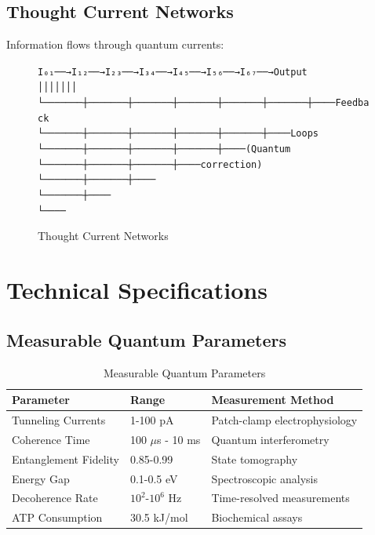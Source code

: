 \documentclass[11pt,a4paper]{article}
\newenvironment{asciiart}{\begin{alltt}}{\end{alltt}}
\begin{document}
\subsection{Thought Current Networks}

Information flows through quantum currents:

\begin{figure}[H]
\centering
\begin{asciiart}
I₀₁ ──→ I₁₂ ──→ I₂₃ ──→ I₃₄ ──→ I₄₅ ──→ I₅₆ ──→ I₆₇ ──→ Output
 │       │       │       │       │       │       │
 └───────┼───────┼───────┼───────┼───────┼───────┼──── Feedback
         └───────┼───────┼───────┼───────┼───────┼──── Loops
                 └───────┼───────┼───────┼───────┼──── (Quantum
                         └───────┼───────┼───────┼──── correction)
                                 └───────┼───────┼────
                                         └───────┼────
                                                 └────
\end{asciiart}
\caption{Thought Current Networks}
\end{figure}

\section{Technical Specifications}

\subsection{Measurable Quantum Parameters}

\begin{table}[H]
\centering
\begin{tabular}{|l|l|l|}
\hline
\textbf{Parameter} & \textbf{Range} & \textbf{Measurement Method} \\
\hline
Tunneling Currents & 1-100 pA & Patch-clamp electrophysiology \\
\hline
Coherence Time & 100 $\mu$s - 10 ms & Quantum interferometry \\
\hline
Entanglement Fidelity & 0.85-0.99 & State tomography \\
\hline
Energy Gap & 0.1-0.5 eV & Spectroscopic analysis \\
\hline
Decoherence Rate & $10^2$-$10^6$ Hz & Time-resolved measurements \\
\hline
ATP Consumption & 30.5 kJ/mol & Biochemical assays \\
\hline
\end{tabular}
\caption{Measurable Quantum Parameters}
\end{table}
\end{document}
